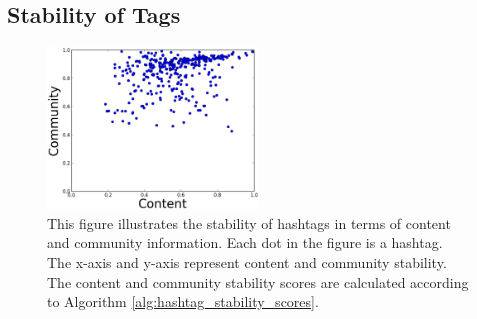 \subsection{Stability of Tags}\label{subsec:hashtag_stability}
\begin{figure}
\begin{center}
    \centering
    \includegraphics[width=0.5\textwidth]{KDD/images/Text-Vs-Users-sNMF-dots-new}            
\end{center}
  \caption[Stability of hashtags]{{This figure illustrates the stability of hashtags in terms of content and community information.  Each dot in the figure
is a hashtag.  The x-axis and y-axis represent content and community stability.  The content and community stability scores are 
calculated according to Algorithm \ref{alg:hashtag_stability_scores}.}  }
\label{fig:Stability}
\vspace{-0.5cm}
\end{figure}
